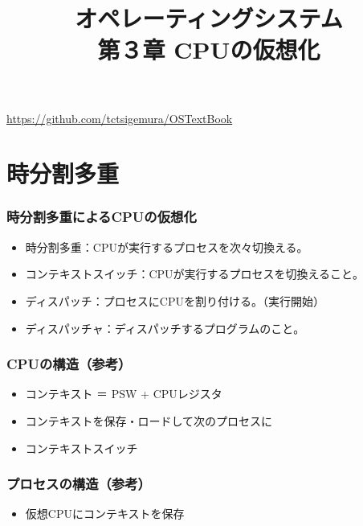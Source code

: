 \documentclass[unicode,handout]{beamer}                   %
\begin{document}
\title[CPUの仮想化]{オペレーティングシステム\\第３章 CPUの仮想化}
\date{}
\begin{frame}
  \titlepage
  \centerline{\url{https://github.com/tctsigemura/OSTextBook}}
\end{frame}


\section{時分割多重}
\begin{frame}
  \frametitle{時分割多重によるCPUの仮想化}
  \begin{itemize}
    \item 時分割多重：CPUが実行するプロセスを次々切換える。
    \item コンテキストスイッチ：CPUが実行するプロセスを切換えること。
    \item ディスパッチ：プロセスにCPUを割り付ける。（実行開始）
    \item ディスパッチャ：ディスパッチするプログラムのこと。
  \end{itemize}
\end{frame}

\begin{frame}
  \frametitle{CPUの構造（参考）}
  \begin{itemize}
    \item コンテキスト ＝ PSW + CPUレジスタ
    \item コンテキストを保存・ロードして次のプロセスに
    \item コンテキストスイッチ
  \end{itemize}
\end{frame}

\begin{frame}
  \frametitle{プロセスの構造（参考）}
  \begin{itemize}
    \item 仮想CPUにコンテキストを保存
  \end{itemize}
\end{frame}
\end{document}

